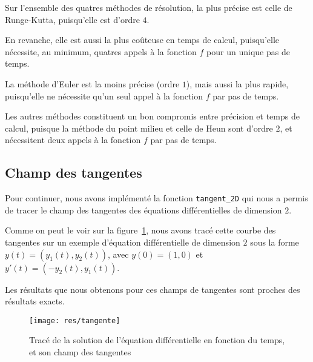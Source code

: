 Sur l'ensemble des quatres méthodes de résolution, la plus précise est celle de Runge-Kutta, puisqu'elle est d'ordre $4$.

En revanche, elle est aussi la plus coûteuse en temps de calcul, puisqu'elle nécessite, au minimum, quatres appels à la fonction $f$ pour un unique pas de temps.

La méthode d'Euler est la moins précise (ordre $1$), mais aussi la plus rapide, puisqu'elle ne nécessite qu'un seul appel à la fonction $f$ par pas de temps.

Les autres méthodes constituent un bon compromis entre précision et temps de calcul, puisque la méthode du point milieu et celle de Heun sont d'ordre $2$, et nécessitent deux appels à la fonction $f$ par pas de temps.

\subsection{Champ des tangentes}
Pour continuer, nous avons implémenté la fonction \texttt{tangent\_2D} qui nous a permis de tracer le champ des tangentes
des équations différentielles de dimension $2$.

Comme on peut le voir sur la figure~\ref{fig:tangente}, nous avons tracé cette courbe des tangentes sur un exemple d'équation différentielle
de dimension $2$ sous la forme $y(t)=(y_1(t),y_2(t))$, avec $y(0)=(1,0)$ et $y'(t)=(-y_2(t),y_1(t))$.

Les résultats que nous obtenons pour ces champs de tangentes sont proches des résultats exacts.

\begin{figure}[htbp!]
	\centering
	\texttt{[image: res/tangente]}
	\caption{Tracé de la solution de l'équation différentielle en fonction du temps, et son champ des tangentes}
	\label{fig:tangente}
\end{figure}
